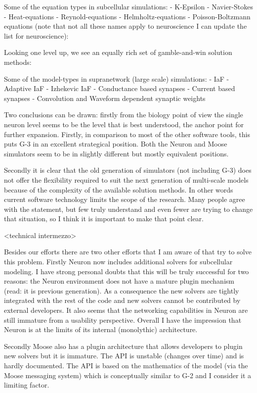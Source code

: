 \documentclass[12pt]{article}
\begin{document}
Some of the equation types in subcellular simulations:
- K-Epsilon
- Navier-Stokes
- Heat-equations
- Reynold-equations
- Helmholtz-equations
- Poisson-Boltzmann equations
(note that not all these names apply to neuroscience I can update the
list for neuroscience):

Looking one level up, we see an equally rich set of gamble-and-win
solution methods:

Some of the model-types in supranetwork (large scale) simulations:
- IaF
- Adaptive IaF
- Izhekevic IaF
- Conductance based synapses
- Current based synapses
- Convolution and Waveform dependent synaptic weights

Two conclusions can be drawn: firstly from the biology point of view
the single neuron level seems to be the level that is best understood,
the anchor point for further expansion.  Firstly, in comparison to
most of the other software tools, this puts G-3 in an excellent
strategical position.  Both the Neuron and Moose simulators seem to be
in slightly different but mostly equivalent positions.

Secondly it is clear that the old generation of simulators (not
including G-3) does not offer the flexibility required to suit the
next generation of multi-scale models because of the complexity of the
available solution methods.  In other words current software
technology limits the scope of the research.  Many people agree with
the statement, but few truly understand and even fewer are trying to
change that situation, so I think it is important to make that point
clear.

<technical intermezzo>

Besides our efforts there are two other efforts that I am aware of
that try to solve this problem.  Firstly Neuron now includes
additional solvers for subcellular modeling.  I have strong personal
doubts that this will be truly successful for two reasons: the Neuron
environment does not have a mature plugin mechanism (read: it is
previous generation).  As a consequence the new solvers are tightly
integrated with the rest of the code and new solvers cannot be
contributed by external developers.  It also seems that the networking
capabilities in Neuron are still immature from a usability
perspective.  Overall I have the impression that Neuron is at the
limits of its internal (monolythic) architecture.

Secondly Moose also has a plugin architecture that allows developers
to plugin new solvers but it is immature.  The API is unstable
(changes over time) and is hardly documented.  The API is based on the
mathematics of the model (via the Moose messaging system) which is
conceptually similar to G-2 and I consider it a limiting factor.
\end{document}
